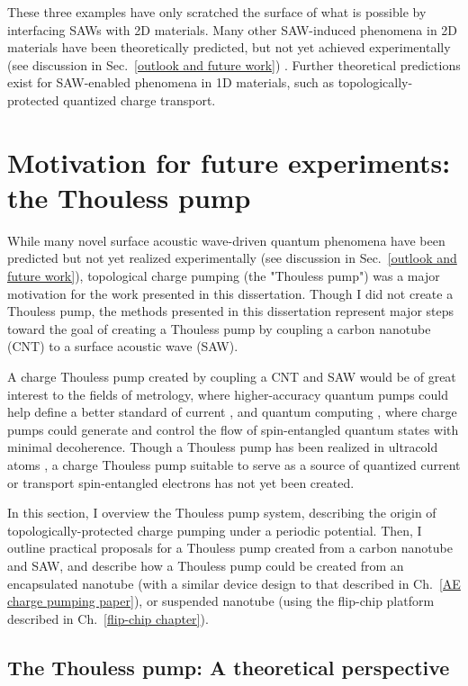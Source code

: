 \documentclass{beavtex_dub_edit}
\begin{document}
These three examples have only scratched the surface of what is possible by interfacing SAWs with 2D materials. Many other SAW-induced phenomena in 2D materials have been theoretically predicted, but not yet achieved experimentally (see discussion in Sec.\ \ref{outlook and future work}) \cite{nie_surface_2023}. Further theoretical predictions exist for SAW-enabled phenomena in 1D materials, such as topologically-protected quantized charge transport.

\section{Motivation for future experiments: the Thouless pump} \label{Thouless pump intro chapter}

While many novel surface acoustic wave-driven quantum phenomena have been predicted but not yet realized experimentally (see discussion in Sec.\ \ref{outlook and future work}), topological charge pumping (the "Thouless pump") was a major motivation for the work presented in this dissertation. Though I did not create a Thouless pump, the methods presented in this dissertation represent major steps toward the goal of creating a Thouless pump by coupling a carbon nanotube (CNT) to a surface acoustic wave (SAW).

A charge Thouless pump created by coupling a CNT and SAW would be of great interest to the fields of metrology, where higher-accuracy quantum pumps could help define a better standard of current \cite{pekola_single-electron_2013,scherer_singleelectron_2019}, and quantum computing \cite{das_controlled_2006}, where charge pumps could generate and control the flow of spin-entangled quantum states with minimal decoherence. Though a Thouless pump has been realized in ultracold atoms \cite{citro_thouless_2023}, a charge Thouless pump suitable to serve as a source of quantized current or transport spin-entangled electrons has not yet been created. 

In this section, I overview the Thouless pump system, describing the origin of topologically-protected charge pumping under a periodic potential. Then, I outline practical proposals for a Thouless pump created from a carbon nanotube and SAW, and describe how a Thouless pump could be created from an encapsulated nanotube (with a similar device design to that described in Ch.\ \ref{AE charge pumping paper}), or suspended nanotube (using the flip-chip platform described in Ch.\ \ref{flip-chip chapter}).

\subsection{The Thouless pump: A theoretical perspective}
\end{document}
